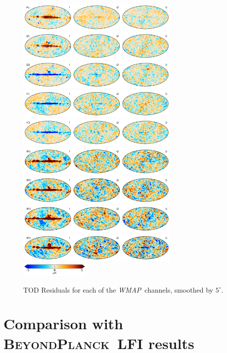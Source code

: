 \documentclass[twocolumn]{../../common/aa}
\def\WMAP{\emph{WMAP}}
\newcommand{\BP}{\textsc{BeyondPlanck}}
\begin{document}
\begin{figure}
	\includegraphics[width=0.7\textwidth]{figures/res_Ka_IQU.pdf}\\
	\includegraphics[width=0.7\textwidth]{figures/res_Q1_IQU.pdf}\\
	\includegraphics[width=0.7\textwidth]{figures/res_Q2_IQU.pdf}\\
	\includegraphics[width=0.7\textwidth]{figures/res_V1_IQU.pdf}\\
	\includegraphics[width=0.7\textwidth]{figures/res_V2_IQU.pdf}\\
	\includegraphics[width=0.7\textwidth]{figures/res_W1_IQU.pdf}\\
	\includegraphics[width=0.7\textwidth]{figures/res_W2_IQU.pdf}\\
	\includegraphics[width=0.7\textwidth]{figures/res_W3_IQU.pdf}\\
	\includegraphics[width=0.7\textwidth]{figures/res_W4_IQU.pdf}\\
	\includegraphics[width=0.30\textwidth]{figures/cbar_5uK.pdf}
	\caption{TOD Residuals for each of the \WMAP\ channels, smoothed by $5^\circ$.}
\end{figure}


\section{Comparison with \BP\ LFI results}
\end{document}
